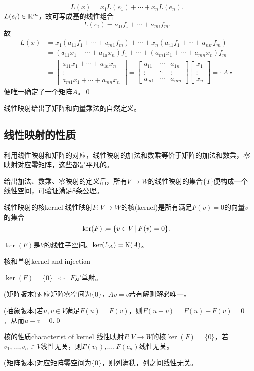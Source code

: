 \[
	L(x)=x_1L(e_1)+\cdots+x_nL(e_n).
\]
$L(e_i)\in\mathbb R^m$，故可写成基的线性组合
\[
	L(e_i)=a_{1i}f_1+\cdots+a_{mi}f_m.
\]
故
\begin{align*}
	L(x)&=x_1(a_{11}f_1+\cdots+a_{m1}f_m)+\cdots+x_n(a_{n1}f_1+\cdots+a_{nm}f_m)\\
	&=(a_{11}x_1+\cdots+a_{1n}x_n)f_1+\cdots+(a_{m1}x_1+\cdots+a_{mn}x_n)f_m\\
	&=\begin{bmatrix}
		a_{11}x_1+\cdots+a_{1n}x_n\\\vdots\\
		a_{m1}x_1+\cdots+a_{mn}x_n
	\end{bmatrix}=\begin{bmatrix}
		a_{11}&\cdots&a_{1n}\\
		\vdots&\ddots&\vdots\\
		a_{m1}&\cdots&a_{mn}
	\end{bmatrix}\begin{bmatrix}
		x_1\\\vdots\\x_n
	\end{bmatrix}=:Ax.
\end{align*}
便唯一确定了一个矩阵$A$。\qed

线性映射给出了矩阵和向量乘法的自然定义。
\subsection{线性映射的性质}
利用线性映射和矩阵的对应，线性映射的加法和数乘等价于矩阵的加法和数乘，零映射对应零矩阵，这些都是平凡的。

给出加法、数乘、零映射的定义后，所有$V\to W$的线性映射的集合$\{T\}$便构成一个线性空间，可验证满足8条公理。
\begin{definition}{线性映射的核}{kernel}
	线性映射$F:V\to W$的核(kernel)是所有满足$F(v)=0$的向量$v$的集合
	\[
		\ker(F):=\left\{v\in V\,\middle\vert\,F(v)=0\right\}.
	\]
\end{definition}
$\ker(F)$是$V$的线性子空间。$\ker (L_A)=\operatorname{N}(A)$。
\begin{theorem}{核和单射}{kernel and injection}
	\begin{center}
		$\ker(F)=\{0\}\enspace\Leftrightarrow\enspace F$是单射。
	\end{center}
\end{theorem}
\prf (矩阵版本)对应矩阵零空间为$\{0\}$，$Av=b$若有解则解必唯一。

(抽象版本)若$u,v\in V$满足$F(u)=F(v)$，则$F(u-v)=F(u)-F(v)=0$，从而$u-v=0.$\qed
\begin{theorem}{核的性质}{characterist of kernel}
	线性映射$F:V\to W$的核$\ker(F)=\{0\}$，若$v_1,\ldots,v_n\in V$线性无关，则$F(v_1),\ldots,F(v_n)$线性无关。
\end{theorem}
\prf (矩阵版本)对应矩阵零空间为$\{0\}$，则列满秩，列之间线性无关。

